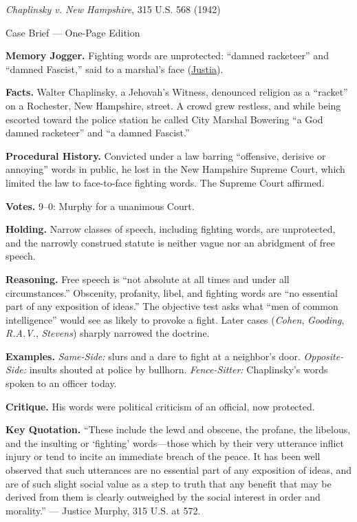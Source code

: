 \documentclass[12pt]{article}
\begin{document}
\begin{center}
{\Large \textit{Chaplinsky v. New Hampshire}, 315 U.S. 568 (1942)\par}
\vspace{0.3em}
{\normalsize Case Brief --- One-Page Edition\par}
\end{center}

\textbf{Memory Jogger.} Fighting words are unprotected: ``damned racketeer'' and ``damned Fascist,'' said to a marshal's face (\href{https://supreme.justia.com/cases/federal/us/315/568/}{Justia}).

\textbf{Facts.} Walter Chaplinsky, a Jehovah's Witness, denounced religion as a ``racket'' on a Rochester, New Hampshire, street. A crowd grew restless, and while being escorted toward the police station he called City Marshal Bowering ``a God damned racketeer'' and ``a damned Fascist.''

\textbf{Procedural History.} Convicted under a law barring ``offensive, derisive or annoying'' words in public, he lost in the New Hampshire Supreme Court, which limited the law to face-to-face fighting words. The Supreme Court affirmed.

\textbf{Votes.} 9--0: Murphy for a unanimous Court.

\textbf{Holding.} Narrow classes of speech, including fighting words, are unprotected, and the narrowly construed statute is neither vague nor an abridgment of free speech.

\textbf{Reasoning.} Free speech is ``not absolute at all times and under all circumstances.'' Obscenity, profanity, libel, and fighting words are ``no essential part of any exposition of ideas.'' The objective test asks what ``men of common intelligence'' would see as likely to provoke a fight. Later cases (\textit{Cohen}, \textit{Gooding}, \textit{R.A.V.}, \textit{Stevens}) sharply narrowed the doctrine.

\textbf{Examples.} \emph{Same-Side:} slurs and a dare to fight at a neighbor's door. \emph{Opposite-Side:} insults shouted at police by bullhorn. \emph{Fence-Sitter:} Chaplinsky's words spoken to an officer today.

\textbf{Critique.} His words were political criticism of an official, now protected.

\textbf{Key Quotation.} ``These include the lewd and obscene, the profane, the libelous, and the insulting or `fighting' words---those which by their very utterance inflict injury or tend to incite an immediate breach of the peace. It has been well observed that such utterances are no essential part of any exposition of ideas, and are of such slight social value as a step to truth that any benefit that may be derived from them is clearly outweighed by the social interest in order and morality.'' --- Justice Murphy, 315 U.S. at 572.
\end{document}
